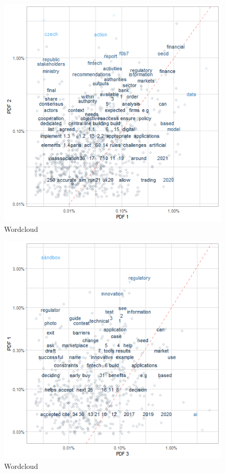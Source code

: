 \documentclass[
]{book}
\begin{document}
\begin{figure}

{\centering \includegraphics[width=0.8\linewidth]{img/p1p2} 

}

\caption{Wordcloud}\label{fig:nice-figjapN2-1}
\end{figure}
\begin{figure}

{\centering \includegraphics[width=0.8\linewidth]{img/p1p3} 

}

\caption{Wordcloud}\label{fig:nice-figjapN2-2}
\end{figure}
\end{document}
